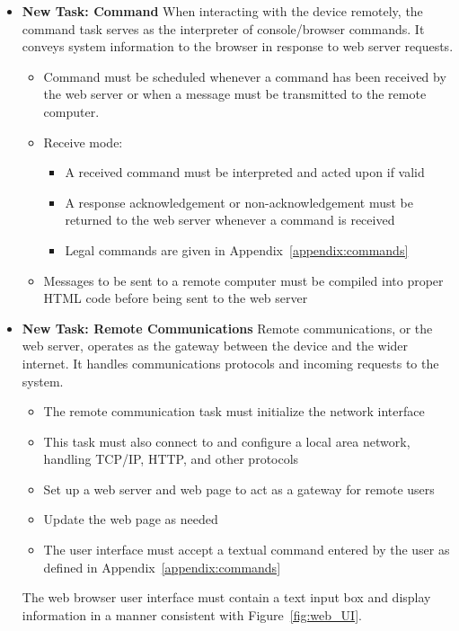 \documentclass[12pt]{article} %
\begin{document}
\begin{itemize}
	\item \textbf{New Task: Command}
		When interacting with the device remotely, the command task serves as the interpreter of console/browser commands. It conveys system information to the browser in response to web server requests.
		\begin{itemize}
			\item Command must be scheduled whenever a command has been received by
				the web server or when a message must be transmitted to the remote
				computer.
			\item Receive mode:
				\begin{itemize}
					\item A received command must be interpreted and acted upon if valid
					\item A response acknowledgement or non-acknowledgement must be
						returned to the web server whenever a command is received
					\item Legal commands are given in Appendix~\ref{appendix:commands}
				\end{itemize}
			\item Messages to be sent to a remote computer must be compiled into proper HTML code before being sent to the web server
		\end{itemize}

	\item \textbf{New Task: Remote Communications}
		Remote communications, or the web server, operates as the gateway between
		the device and the wider internet. It handles communications protocols and
		incoming requests to the system.
		\begin{itemize}
			\item The remote communication task must initialize the network interface
			\item This task must also connect to and configure a local area network,
				handling TCP/IP, HTTP, and other protocols
			\item Set up a web server and web page to act as a gateway for remote users
			\item Update the web page as needed
			\item The user interface must accept a textual command entered by the user as defined in Appendix~\ref{appendix:commands}
		\end{itemize}

		The web browser user interface must contain a text input box and display information in a manner consistent with Figure~\ref{fig:web_UI}.


\end{itemize}
\end{document}
